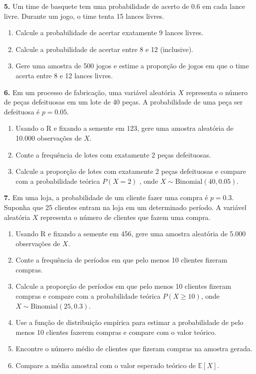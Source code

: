 \documentclass[
]{book}
\providecommand{\tightlist}{%
  \setlength{\itemsep}{0pt}\setlength{\parskip}{0pt}}
\begin{document}
\textbf{5.} Um time de basquete tem uma probabilidade de acerto de 0.6 em cada lance livre. Durante um jogo, o time tenta 15 lances livres.

\begin{enumerate}
\def\labelenumi{(\alph{enumi})}
\tightlist
\item
  Calcule a probabilidade de acertar exatamente 9 lances livres.
\item
  Calcule a probabilidade de acertar entre 8 e 12 (inclusive).
\item
  Gere uma amostra de 500 jogos e estime a proporção de jogos em que o time acerta entre 8 e 12 lances livres.
\end{enumerate}

\textbf{6.} Em um processo de fabricação, uma variável aleatória \(X\) representa o número de peças defeituosas em um lote de 40 peças. A probabilidade de uma peça ser defeituosa é \(p = 0.05\).

\begin{enumerate}
\def\labelenumi{(\alph{enumi})}
\tightlist
\item
  Usando o R e fixando a semente em 123, gere uma amostra aleatória de 10.000 observações de \(X\).
\item
  Conte a frequência de lotes com exatamente 2 peças defeituosas.
\item
  Calcule a proporção de lotes com exatamente 2 peças defeituosas e compare com a probabilidade teórica \(P(X = 2)\) , onde \(X \sim \text{Binomial}(40, 0.05)\).
\end{enumerate}

\textbf{7.} Em uma loja, a probabilidade de um cliente fazer uma compra é \(p = 0.3\). Suponha que 25 clientes entram na loja em um determinado período. A variável aleatória \(X\) representa o número de clientes que fazem uma compra.

\begin{enumerate}
\def\labelenumi{(\alph{enumi})}
\tightlist
\item
  Usando R e fixando a semente em 456, gere uma amostra aleatória de 5.000 observações de \(X\).
\item
  Conte a frequência de períodos em que pelo menos 10 clientes fizeram compras.
\item
  Calcule a proporção de períodos em que pelo menos 10 clientes fizeram compras e compare com a probabilidade teórica \(P(X \geq 10)\), onde \(X \sim \text{Binomial}(25, 0.3)\).
\item
  Use a função de distribuição empírica para estimar a probabilidade de pelo menos 10 clientes fazerem compras e compare com o valor teórico.
\item
  Encontre o número médio de clientes que fizeram compras na amostra gerada.
\item
  Compare a média amostral com o valor esperado teórico de \(\mathbb{E}[X]\).
\end{enumerate}
\end{document}
